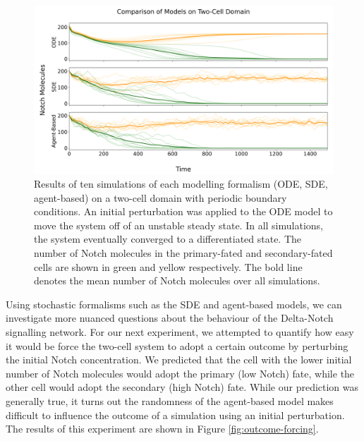 \documentclass{article}
\begin{document}
\begin{figure}[!htp]
  \includegraphics[width=\textwidth]{img/vis123.png}
  \caption{Results of ten simulations of each modelling formalism (ODE, SDE, agent-based) on a two-cell domain with periodic boundary conditions. An initial perturbation was applied to the ODE model to move the system off of an unstable steady state. In all simulations, the system eventually converged to a differentiated state. The number of Notch molecules in the primary-fated and secondary-fated cells  are shown in green and yellow respectively. The bold line denotes the mean number of Notch molecules over all simulations.}
  \label{fig:two-cell-simulations}
\end{figure}

Using stochastic formalisms such as the SDE and agent-based models, we can investigate more nuanced questions about the behaviour of the Delta-Notch signalling network. 
For our next experiment, we attempted to quantify how easy it would be force the two-cell system to adopt a certain outcome by perturbing the initial Notch concentration.
We predicted that the cell with the lower initial number of Notch molecules would adopt the primary (low Notch) fate, while the other cell would adopt the secondary (high Notch) fate.
While our prediction was generally true, it turns out the randomness of the agent-based model makes difficult to influence the outcome of a simulation using an initial perturbation.
The results of this experiment are shown in Figure \ref{fig:outcome-forcing}.
\end{document}
